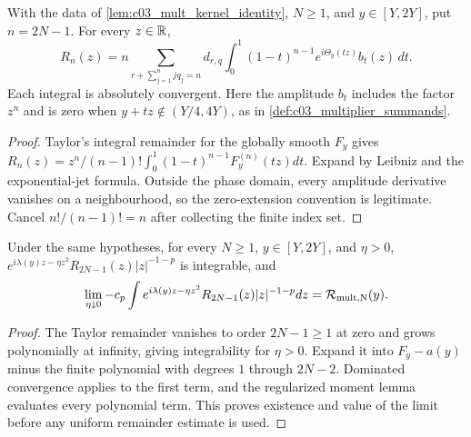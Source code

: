 \begin{lemma}
  \label{lem:c03_mult_taylor_formula}
  With the data of \cref{lem:c03_mult_kernel_identity}, $N\ge1$, and $y\in[Y,2Y]$,
  put $n=2N-1$. For every $z\in\mathbb{R}$,
  \[
    R_n(z)=n\sum_{r+\sum_{j=1}^n j q_j=n}d_{r,q}
       \int_0^1(1-t)^{n-1}e^{i\Theta_y(tz)}b_t(z)\,dt.
  \]
  Each integral is absolutely convergent. Here the amplitude $b_t$ includes the factor $z^n$
  and is zero when $y+tz\notin(Y/4,4Y)$, as in \cref{def:c03_multiplier_summands}.
\end{lemma}
\begin{proof}
  Taylor's integral remainder for the globally smooth $F_y$ gives
  $R_n(z)=z^n/(n-1)!\int_0^1(1-t)^{n-1}F_y^{(n)}(tz)dt$.
  Expand by Leibniz and the exponential-jet formula. Outside the phase domain, every
  amplitude derivative vanishes on a neighbourhood, so the zero-extension convention is legitimate.
  Cancel $n!/(n-1)!=n$ after collecting the finite index set.
\end{proof}

\begin{lemma}
  \label{lem:c03_mult_taylor_regularized_limit}
  Under the same hypotheses, for every $N\ge1$, $y\in[Y,2Y]$, and $\eta>0$,
  $e^{i\lambda(y)z-\eta z^2}R_{2N-1}(z)|z|^{-1-p}$ is integrable, and
  \[
    \lim_{\eta\downarrow0}-c_p\int e^{i\lambda(y)z-\eta z^2}
                           R_{2N-1}(z)|z|^{-1-p}dz=\mathcal{R}_{\rm mult,N}(y).
  \]
\end{lemma}
\begin{proof}
  The Taylor remainder vanishes to order $2N-1\ge1$ at zero and grows polynomially at infinity,
  giving integrability for $\eta>0$. Expand it into $F_y-a(y)$ minus the finite polynomial
  with degrees $1$ through $2N-2$. Dominated convergence applies to the first term,
  and the regularized moment lemma evaluates every polynomial term. This proves existence
  and value of the limit before any uniform remainder estimate is used.
\end{proof}

